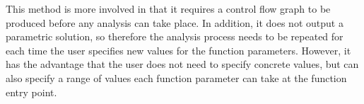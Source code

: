 This method is more involved in that it requires a control flow graph to be produced before any analysis
can take place. In addition, it does not output a parametric solution, so therefore the analysis process needs to be repeated for 
each time the user specifies new values for the function parameters. However, it has the advantage that the user does not need to specify
concrete values, but can also specify a range of values each function parameter can take at the function entry point.

















